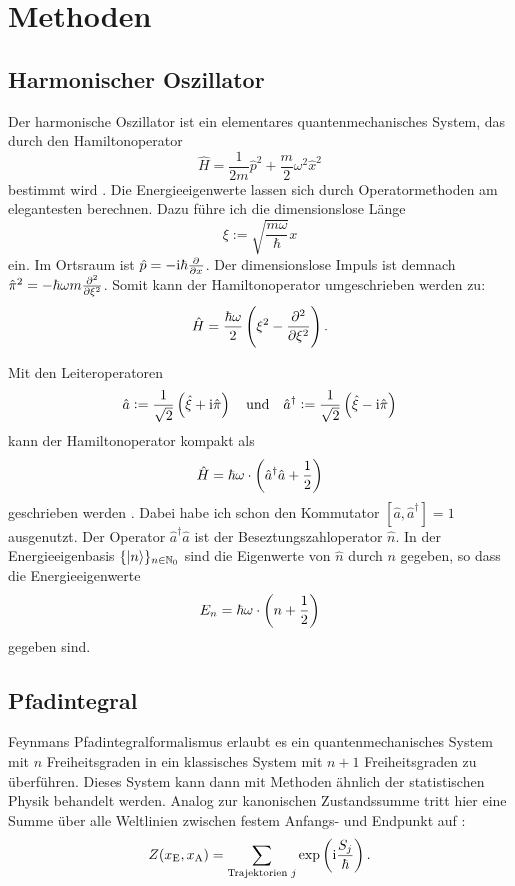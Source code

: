 
\chapter{Methoden}

\section{Harmonischer Oszillator}

Der harmonische Oszillator ist ein elementares quantenmechanisches System, das
durch den Hamiltonoperator
\[
    \hat H = \frac{1}{2m} \hat p^2 + \frac{m}{2} \omega^2 \hat x^2
\]
bestimmt wird \parencite[(3.1)]{Schwabl/Quantenmechanik}. Die Energieeigenwerte
lassen sich durch Operatormethoden am elegantesten berechnen. Dazu führe ich
die dimensionslose Länge
\[
    \xi := \sqrt{\frac{m\omega}{\hbar}} x
\]
ein. Im Ortsraum ist $\hat p = - \iup \hbar \pd{}x$. Der dimensionslose Impuls
ist demnach $\hat \pi^2 = - \hbar\omega m \pd[2]{}\xi$. Somit kann der
Hamiltonoperator umgeschrieben werden zu:
\[
    \hat H = \frac{\hbar\omega}2 \del{\xi^2 - \dpd[2]{}\xi}.
\]

Mit den Leiteroperatoren
\[
    \hat a := \frac1{\sqrt2} \del{\hat \xi + \iup \hat \pi}
    \quad\text{und}\quad
    \hat a^\dagger := \frac1{\sqrt2} \del{\hat \xi - \iup \hat \pi}
\]
kann der Hamiltonoperator kompakt als
\[
    \hat H = \hbar\omega \cdot \del{\hat a^\dagger \hat a + \frac12}
\]
geschrieben werden \parencite[(3.8)]{Schwabl/Quantenmechanik}. Dabei habe ich
schon den Kommutator $[\hat a, \hat a^\dagger] = 1$ ausgenutzt. Der Operator
$\hat a^\dagger \hat a$ ist der Beseztungszahloperator $\hat n$. In der
Energieeigenbasis $\{ \ket n \}_{n \in \mathbb N_0}$ sind die Eigenwerte von $\hat n$
durch $n$ gegeben, so dass die Energieeigenwerte
\[
    E_n = \hbar\omega \cdot \del{n + \frac 12}
\]
gegeben sind.

\section{Pfadintegral}

Feynmans Pfadintegralformalismus erlaubt es ein quantenmechanisches System mit
$n$ Freiheitsgraden in ein klassisches System mit $n+1$ Freiheitsgraden zu
überführen. Dieses System kann dann mit Methoden ähnlich der statistischen
Physik behandelt werden. Analog zur kanonischen Zustandssumme tritt hier eine
Summe über alle Weltlinien zwischen festem Anfangs- und Endpunkt auf
\parencite[(2.7)]{Creutz/Statistical_Approach_QM}:
\[
    Z(x_\text E, x_\text A) = \sum_{\text{Trajektorien $j$}} \exp\del{ \iup
    \frac{S_j}{\hbar}}.
\]

